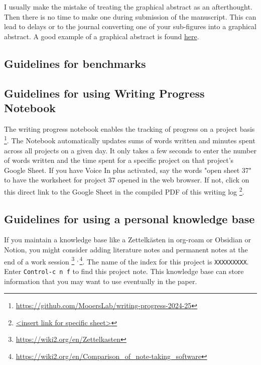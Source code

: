 \documentclass[11pt,letterpaper]{article}
\begin{document}
I usually make the mistake of treating the graphical abstract as an
afterthought. Then there is no time to make one during submission of the
manuscript. This can lead to delays or to the journal converting one of
your sub-figures into a graphical abstract. A good example of a
graphical abstract is found
\href{https://www.mdpi.com/2073-4352/11/3/273}{here}.


\subsection{Guidelines for benchmarks}
\label{sec:orgb1897f7}


\subsection{Guidelines for using Writing Progress Notebook}
\label{sec:orgcb9d675}

The writing progress notebook enables the tracking of progress on a
project basis \footnote{\url{https://github.com/MooersLab/writing-progress-2024-25}}. The Notebook automatically updates sums of words
written and minutes spent across all projects on a given day. It only
takes a few seconds to enter the number of words written and the time
spent for a specific project on that project's Google Sheet. If you have
Voice In plus activated, say the words "open sheet 37" to have the
worksheet for project 37 opened in the web browser. If not, click on
this direct link to the Google Sheet in the compiled PDF of this writing
log \footnote{\href{<insert link for specific sheet>}{<insert link for specific sheet>}}.


\subsection{Guidelines for using a personal knowledge base}
\label{sec:orgf9f76d8}

If you maintain a knowledge base like a Zettelkästen in org-roam or
Obsidian or Notion, you might consider adding literature notes and
permanent notes at the end of a work session \footnote{\url{https://wiki2.org/en/Zettelkasten}} \textsuperscript{,}\,\footnote{\url{https://wiki2.org/en/Comparison\_of\_note-taking\_software}}. The name of
the index for this project is \texttt{XXXXXXXXX}. Enter \texttt{Control-c n f} to find
this project note. This knowledge base can store information that you
may want to use eventually in the paper.
\end{document}
